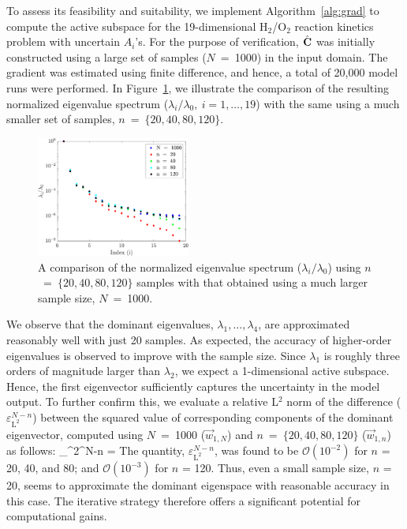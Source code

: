 To assess its feasibility and suitability, we implement
Algorithm~\ref{alg:grad} to compute the active subspace for 
the 19-dimensional H$_2$/O$_2$ reaction kinetics
problem with uncertain $A_i$'s. For the purpose of verification,
$\hat{\mathbf{{C}}}$ was initially constructed using a large set of samples
($N$~=~1000) in the input domain. The gradient was estimated using
finite difference, and hence, a total of 20,000 model runs were performed. 
In Figure~\ref{fig:eig_comp}, we illustrate the comparison of
the resulting normalized eigenvalue spectrum ($\lambda_i/\lambda_0,~i = 1,\ldots,19$)
with the same using a much 
smaller set of samples, $n$~=~$\{20,40,80,120\}$.
%
\begin{figure}[htbp]
 \begin{center}
  \includegraphics[width=0.45\textwidth]{./Figures/eig_comp}
\caption{A comparison of the normalized eigenvalue spectrum ($\lambda_i/\lambda_0$)
using $n$~=~$\{20,40,80,120\}$ samples with that
obtained using a much larger sample size, $N$~=~1000. 
} 
\label{fig:eig_comp}
\end{center}
\end{figure}
%
We observe that the dominant eigenvalues, $\lambda_1, \ldots, \lambda_4$, 
are approximated 
reasonably well with just 20 samples. As expected, the accuracy of higher-order eigenvalues is observed
to improve with the sample size. Since 
$\lambda_1$ is roughly three orders of magnitude larger than $\lambda_2$, we expect 
a 1-dimensional active subspace. Hence, the first eigenvector 
sufficiently captures the uncertainty in
the  model output. To further confirm this, we evaluate a relative L$^2$ norm of the difference
 ($\varepsilon_{\text{L}^{2}}^{N-n}$) between the 
squared value of corresponding components of the dominant eigenvector, computed using $N$~=~1000 ($\vec{w}_{1,N}$)
and $n$~=~$\{20,40,80,120\}$ ($\vec{w}_{1,n}$) as follows:
%
\be
\varepsilon_{^{2}}^{N-n} = 
\ee
%
The quantity, $\varepsilon_{\text{L}^{2}}^{N-n}$, was found to be 
$\mathcal{O}(10^{-2})$ for $n$ = 20, 40, and 80; and $\mathcal{O}(10^{-3})$ for $n$ = 120.
Thus, even a small sample size, $n$ = 20, seems to approximate the dominant eigenspace with
reasonable accuracy in this case. 
The iterative strategy therefore offers a significant potential for computational gains. 

